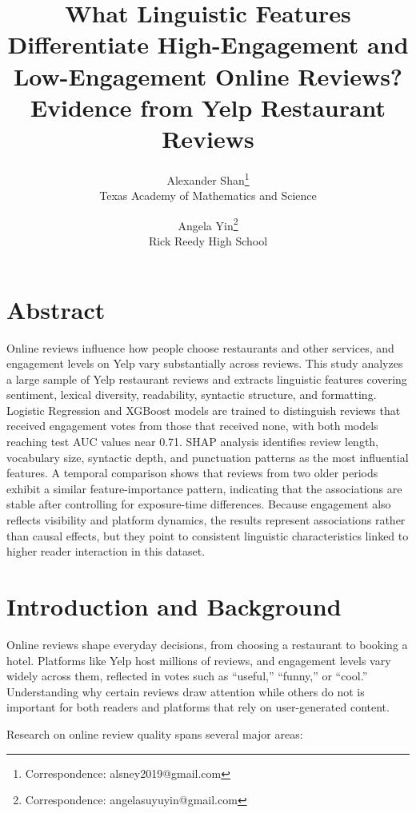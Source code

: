 \documentclass[12pt]{article}
\title{What Linguistic Features Differentiate High-Engagement and Low-Engagement Online Reviews? Evidence from Yelp Restaurant Reviews}
\author{
Alexander Shan\thanks{Correspondence: alsney2019@gmail.com}\\
Texas Academy of Mathematics and Science
\and
Angela Yin\thanks{Correspondence: angelasuyuyin@gmail.com}\\
Rick Reedy High School
}
\begin{document}
\maketitle

\fontsize{12pt}{12pt}\selectfont

\section*{Abstract}

Online reviews influence how people choose restaurants and other services, and engagement levels on Yelp vary substantially across reviews. 
This study analyzes a large sample of Yelp restaurant reviews and extracts linguistic features covering sentiment, lexical diversity, readability, syntactic structure, 
and formatting. Logistic Regression and XGBoost models are trained to distinguish reviews that received engagement votes from those that received none, 
with both models reaching test AUC values near 0.71. SHAP analysis identifies review length, vocabulary size, syntactic depth, and punctuation patterns as the most influential features. A temporal comparison shows that reviews from two older periods exhibit a similar feature-importance pattern, indicating that the associations are stable after controlling for exposure-time differences. Because engagement also reflects visibility and platform dynamics, the results represent associations rather than causal effects, 
but they point to consistent linguistic characteristics linked to higher reader interaction in this dataset.

\section{Introduction and Background}

Online reviews shape everyday decisions, from choosing a restaurant to booking a hotel. 
Platforms like Yelp host millions of reviews, and engagement levels vary widely across them, reflected in votes such as “useful,” “funny,” 
or “cool.” Understanding why certain reviews draw attention while others do not is important for both readers and platforms that rely on 
user-generated content.
 
Research on online review quality spans several major areas:
\end{document}
